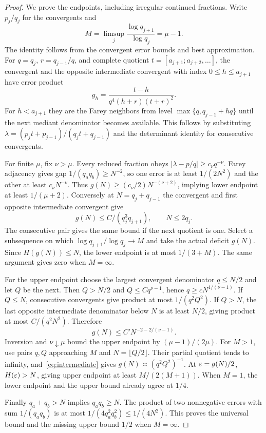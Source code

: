 \begin{proof}
We prove the endpoints, including irregular continued fractions. Write $p_j/q_j$ for the convergents and
\[
 M=\limsup_j\frac{\log q_{j+1}}{\log q_j}=\mu-1.
\]
The identity follows from the convergent error bounds and best approximation. For $q=q_j$, $r=q_{j-1}/q$, and complete quotient $t=[a_{j+1};a_{j+2},\ldots]$, the convergent and the opposite intermediate convergent with index $0\le h\le a_{j+1}$ have error product
\begin{equation}\label{eq:intermediate}
 g_h=\frac{t-h}{q^4(h+r)(t+r)^2}.
\end{equation}
For $h<a_{j+1}$ they are the Farey neighbors from level $\max\{q,q_{j-1}+hq\}$ until the next mediant denominator becomes available. This follows by substituting $\lambda=(p_jt+p_{j-1})/(q_jt+q_{j-1})$ and the determinant identity for consecutive convergents.

For finite $\mu$, fix $\nu>\mu$. Every reduced fraction obeys $|\lambda-p/q|\ge c_\nu q^{-\nu}$. Farey adjacency gives gap $1/(q_aq_b)\ge N^{-2}$, so one error is at least $1/(2N^2)$ and the other at least $c_\nu N^{-\nu}$. Thus $g(N)\ge(c_\nu/2)N^{-(\nu+2)}$, implying lower endpoint at least $1/(\mu+2)$. Conversely at $N=q_j+q_{j-1}$ the convergent and first opposite intermediate convergent give
\[
 g(N)\le C/(q_j^3q_{j+1}),\qquad N\le2q_j.
\]
The consecutive pair gives the same bound if the next quotient is one. Select a subsequence on which $\log q_{j+1}/\log q_j\to M$ and take the actual deficit $g(N)$. Since $H(g(N))\le N$, the lower endpoint is at most $1/(3+M)$. The same argument gives zero when $M=\infty$.

For the upper endpoint choose the largest convergent denominator $q\le N/2$ and let $Q$ be the next. Then $Q>N/2$ and $Q\le Cq^{\nu-1}$, hence $q\ge cN^{1/(\nu-1)}$. If $Q\le N$, consecutive convergents give product at most $1/(q^2Q^2)$. If $Q>N$, the last opposite intermediate denominator below $N$ is at least $N/2$, giving product at most $C/(q^2N^2)$. Therefore
\[
 g(N)\le C'N^{-2-2/(\nu-1)}.
\]
Inversion and $\nu\downarrow\mu$ bound the upper endpoint by $(\mu-1)/(2\mu)$. For $M>1$, use pairs $q,Q$ approaching $M$ and $N=\lfloor Q/2\rfloor$. Their partial quotient tends to infinity, and~\eqref{eq:intermediate} gives $g(N)\asymp(q^2Q^2)^{-1}$. At $\varepsilon=g(N)/2$, $H(\varepsilon)>N$, giving upper endpoint at least $M/(2(M+1))$. When $M=1$, the lower endpoint and the upper bound already agree at $1/4$.

Finally $q_a+q_b>N$ implies $q_aq_b\ge N$. The product of two nonnegative errors with sum $1/(q_aq_b)$ is at most $1/(4q_a^2q_b^2)\le1/(4N^2)$. This proves the universal bound and the missing upper bound $1/2$ when $M=\infty$.
\end{proof}

